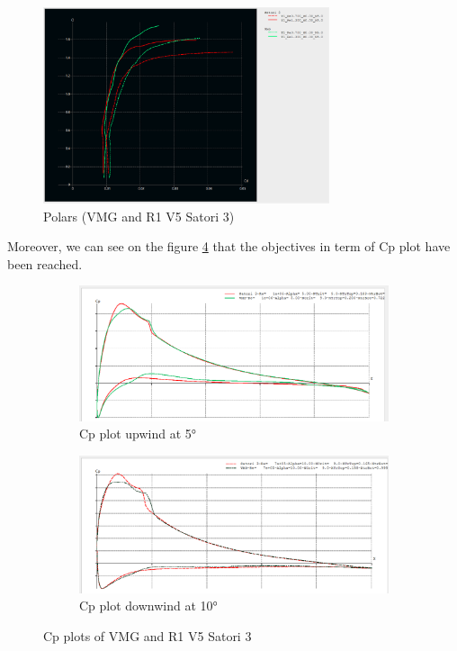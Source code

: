 \begin{figure}[H]
    \centering
    \includegraphics[width=0.75\textwidth]{figures/2D steady simulations/xflr5/polar vmg sato3.png}
    \caption{Polars (VMG and R1 V5 Satori 3)}
    \label{fig:Polar_of_the_VMG_and_R1_V5_Satori_3}
\end{figure}

Moreover, we can see on the figure \ref{fig:Cp_plots_of_VMG_and_R1_V5_Satori_3} that the objectives in term of Cp plot have been reached. 

\begin{figure}[H]
    \begin{subfigure}{0.5\linewidth}
    \includegraphics[width=1.\linewidth]{figures/2D steady simulations/airfoil design/cp upwind 5deg vmg sato3.png}
    \caption{Cp plot upwind at 5°}
    \label{fig:Cp_plot_upwind_at_5°}
    \end{subfigure}
    \begin{subfigure}{0.5\linewidth}
    \includegraphics[width=1.\linewidth]{figures/2D steady simulations/airfoil design/cp downwind 10deg vmg sato3.png}
    \caption{Cp plot downwind at 10°}
    \label{fig:Cp_plot_downwind_at_10°}
    \end{subfigure}
    \caption{Cp plots of VMG and R1 V5 Satori 3}
\label{fig:Cp_plots_of_VMG_and_R1_V5_Satori_3}
\end{figure}

